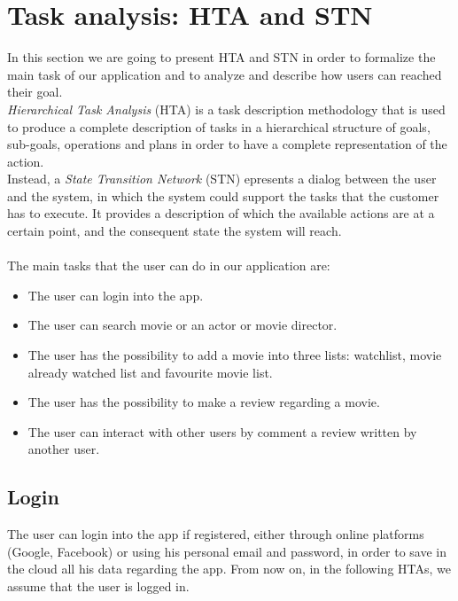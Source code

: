 \documentclass[12pt, a4paper]{article}
\begin{document}

\newpage

\section{Task analysis: HTA and STN}


In this section we are going to present HTA and STN in order to formalize the main task of 
our application and to analyze and describe how users can reached their goal.\\
\textit{Hierarchical Task Analysis} (HTA) is a task description methodology that is used to produce a 
complete description of tasks in a hierarchical structure of goals, sub-goals, operations and plans 
in order to have a complete representation of the action.\\
Instead, a \textit{State Transition Network} (STN) epresents a dialog between the user and the system, 
in which the system could support the tasks that the customer has to execute.
It provides a description of which the available actions are at a certain point, and the consequent 
state the system will reach.\\\\
The main tasks that the user can do in our application are:
\begin{itemize}
	\item The user can login into the app.
	\item The user can search movie or an actor or movie director.
	\item The user has the possibility to add a movie into three lists: watchlist, movie already watched list and favourite movie list.
	\item The user has the possibility to make a review regarding a movie.
	\item The user can interact with other users by comment a review written by another user.
\end{itemize}
\hbox{}
\subsection{Login}
The user can login into the app if registered, either through online platforms (Google, Facebook) 
or using his personal email and password, in order to save in the cloud all his data regarding the app. 
From now on, in the following HTAs, we assume that the user is logged in.\\ %
\end{document}
